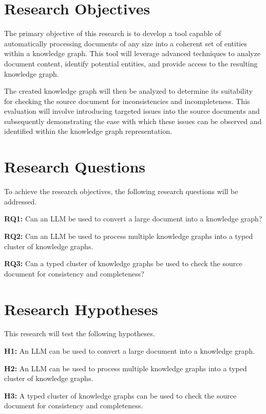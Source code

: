 \section{Research Objectives}
The primary objective of this research is to develop a tool capable of automatically processing documents of any size into a coherent set of entities within a knowledge graph. This tool will leverage advanced techniques to analyze document content, identify potential entities, and provide access to the resulting knowledge graph.

The created knowledge graph will then be analyzed to determine its suitability for checking the source document for inconsistencies and incompleteness. This evaluation will involve introducing targeted issues into the source documents and subsequently demonstrating the ease with which these issues can be observed and identified within the knowledge graph representation.

\section{Research Questions}
To achieve the research objectives, the following research questions will be addressed.

\textbf{RQ1:} Can an LLM be used to convert a large document into a knowledge graph?\par

\textbf{RQ2:} Can an LLM be used to process multiple knowledge graphs into a typed cluster of knowledge graphs.\par

\textbf{RQ3:} Can a typed cluster of knowledge graphs be used to check the source document for consistency and completeness?\par
\section{Research Hypotheses}
This research will test the following hypotheses.

\textbf{H1:} An LLM can be used to convert a large document into a knowledge graph.\par

\textbf{H2:} An LLM can be used to process multiple knowledge graphs into a typed cluster of knowledge graphs.\par

\textbf{H3:} A typed cluster of knowledge graphs can be used to check the source document for consistency and completeness.\par

